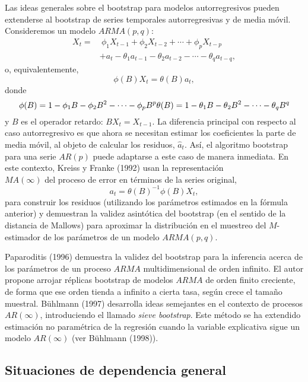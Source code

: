 \documentclass[
]{book}
\theoremstyle{break}
\theoremstyle{definition}
\theoremstyle{definition}
\theoremstyle{definition}
\theoremstyle{remark}
\begin{document}
Las ideas generales sobre el bootstrap para modelos autorregresivos
pueden extenderse al bootstrap de series temporales autorregresivas y de
media móvil. Consideremos un modelo \(ARMA(p,q)\): \[\begin{aligned}
X_{t} =&\ \phi _1X_{t-1}+\phi _2X_{t-2}+\cdots +\phi _{p}X_{t-p} \\
&+a_{t}-\theta _1a_{t-1}-\theta _2a_{t-2}-\cdots -\theta _{q}a_{t-q},\end{aligned}\]o,
equivalentemente,
\[\phi (B)X_{t}=\theta (B)a_{t},\]
donde
\[\phi (B)=1-\phi _1B-\phi _2B^2-\cdots -\phi _{p}B^{p}\\ 
\theta(B)=1-\theta _1B-\theta _2B^2-\cdots -\theta _{q}B^{q}\]
y \(B\) es el operador retardo: \(BX_{t}=X_{t-1}\).
La diferencia principal con
respecto al caso autorregresivo es que ahora se necesitan estimar los
coeficientes la parte de media móvil, al objeto de calcular los
residuos, \(\widehat{a}_{t}\).
Así, el algoritmo bootstrap para una serie \(AR(p)\) puede
adaptarse a este caso de manera inmediata.
En este contexto, Kreiss y Franke (1992) usan la representación\\
\(MA(\infty )\) del proceso de error en términos de la series original,
\[a_{t}=\theta (B)^{-1}\phi(B) X_{t},\]
para construir los residuos
(utilizando los parámetros estimados en la fórmula anterior) y demuestran
la validez asintótica del bootstrap (en el sentido de la distancia de Mallows)
para aproximar la distribución en el muestreo del \(M\)-estimador de los
parámetros de un modelo \(ARMA(p,q)\).

Paparoditis (1996) demuestra la validez del bootstrap para la inferencia
acerca de los parámetros de un proceso \(ARMA\) multidimensional de orden
infinito. El autor propone arrojar réplicas bootstrap de modelos \(ARMA\)
de orden finito creciente, de forma que ese orden tienda a infinito a
cierta tasa, según crece el tamaño muestral. Bühlmann (1997) desarrolla
ideas semejantes en el contexto de procesos \(AR\left( \infty \right)\),
introduciendo el llamado \emph{sieve bootstrap}. Este método se ha extendido
estimación no paramétrica de la regresión cuando la variable explicativa
sigue un modelo \(AR\left( \infty \right)\) (ver Bühlmann (1998)).

\hypertarget{situaciones-de-dependencia-general-1}{%
\subsection{Situaciones de dependencia general}\label{situaciones-de-dependencia-general-1}}
\end{document}
